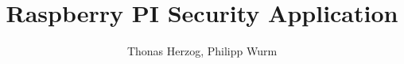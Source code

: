 \documentclass[]{article}
\title{Raspberry PI Security Application}
\author{Thonas Herzog, Philipp Wurm}
\begin{document}
\maketitle

\begin{abstract}
\end{abstract}









\end{document}
